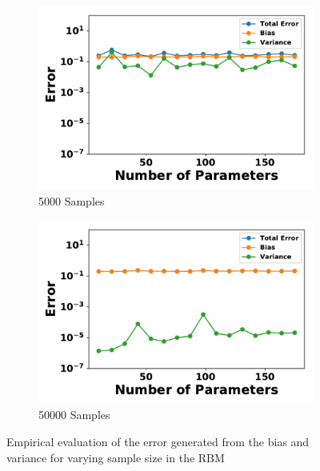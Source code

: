 \documentclass[letterpaper]{article} %
\begin{document}
\begin{figure}[p]
\begin{subfigure}[b]{0.245\textwidth}
              \includegraphics[width=\textwidth]{./RBM_Error_vs_HiddenNodes_Samples5000-eps-converted-to.pdf}
              \caption{5000 Samples}
          \end{subfigure}
          \begin{subfigure}[b]{0.245\textwidth}
              \centering
              \includegraphics[width=\textwidth]{./RBM_Error_vs_HiddenNodes_Samples50000-eps-converted-to.pdf}
              \caption{50000 Samples}
          \end{subfigure}
          \caption{Empirical evaluation of the error generated from the bias and variance for varying sample size in the RBM} \label{fig:RBM_hidden_nodes}
        \end{figure}
        
\end{document}
